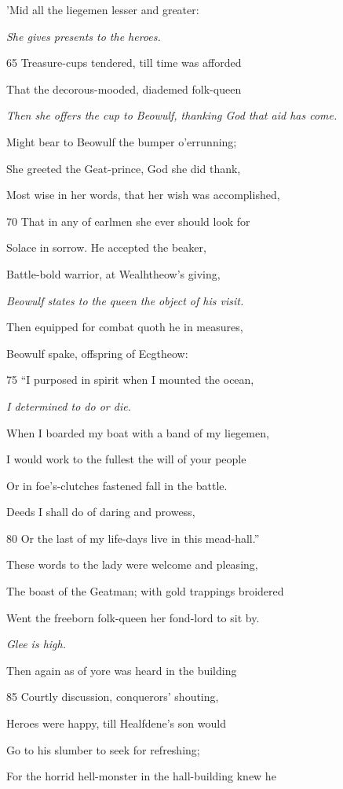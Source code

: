 ’Mid all the liegemen lesser and greater:

\emph{She gives presents
to the heroes.}

65
Treasure-cups tendered, till time was afforded

That the decorous-mooded, diademed folk-queen

\emph{Then she offers the
cup to Beowulf,
thanking God that
aid has come.}

Might bear to Beowulf the bumper o’errunning;

She greeted the Geat-prince, God she did thank,

Most wise in her words, that her wish was accomplished,

70
That in any of earlmen she ever should look for

Solace in sorrow. He accepted the beaker,

Battle-bold warrior, at Wealhtheow’s giving,

\emph{Beowulf states to
the queen the object
of his visit.}

Then equipped for combat quoth he in measures,

Beowulf spake, offspring of Ecgtheow:

75
“I purposed in spirit when I mounted the ocean,

\emph{I determined to do
or die.}

When I boarded my boat with a band of my liegemen,

I would work to the fullest the will of your people

Or in foe’s-clutches fastened fall in the battle.

Deeds I shall do of daring and prowess,

80
Or the last of my life-days live in this mead-hall.”

These words to the lady were welcome and pleasing,

The boast of the Geatman; with gold trappings broidered

Went the freeborn folk-queen her fond-lord to sit by.

\emph{Glee is high.}

Then again as of yore was heard in the building

85
Courtly discussion, conquerors’ shouting,

Heroes were happy, till Healfdene’s son would

Go to his slumber to seek for refreshing;

For the horrid hell-monster in the hall-building knew he

